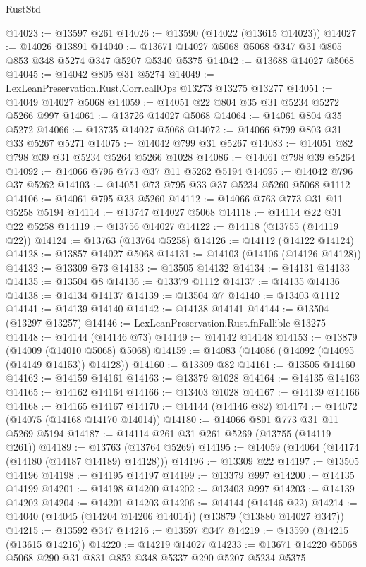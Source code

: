\begin{lexlean}{RustStd}
\begin{coremodule}
@14023 := @13597 @261
@14026 := @13590 (@14022 (@13615 @14023))
@14027 := @14026 @13891
@14040 := @13671 @14027 @5068 @5068 @347 @31 @805 @853 @348 @5274 @347 @5207 @5340 @5375
@14042 := @13688 @14027 @5068
@14045 := @14042 @805 @31 @5274
@14049 := LexLeanPreservation.Rust.Corr.callOps @13273 @13275 @13277
@14051 := @14049 @14027 @5068
@14059 := @14051 @22 @804 @35 @31 @5234 @5272 @5266 @997
@14061 := @13726 @14027 @5068
@14064 := @14061 @804 @35 @5272
@14066 := @13735 @14027 @5068
@14072 := @14066 @799 @803 @31 @33 @5267 @5271
@14075 := @14042 @799 @31 @5267
@14083 := @14051 @82 @798 @39 @31 @5234 @5264 @5266 @1028
@14086 := @14061 @798 @39 @5264
@14092 := @14066 @796 @773 @37 @11 @5262 @5194
@14095 := @14042 @796 @37 @5262
@14103 := @14051 @73 @795 @33 @37 @5234 @5260 @5068 @1112
@14106 := @14061 @795 @33 @5260
@14112 := @14066 @763 @773 @31 @11 @5258 @5194
@14114 := @13747 @14027 @5068
@14118 := @14114 @22 @31 @22 @5258
@14119 := @13756 @14027
@14122 := @14118 (@13755 (@14119 @22))
@14124 := @13763 (@13764 @5258)
@14126 := @14112 (@14122 @14124)
@14128 := @13857 @14027 @5068
@14131 := @14103 (@14106 (@14126 @14128))
@14132 := @13309 @73
@14133 := @13505 @14132
@14134 := @14131 @14133
@14135 := @13504 @8
@14136 := @13379 @1112
@14137 := @14135 @14136
@14138 := @14134 @14137
@14139 := @13504 @7
@14140 := @13403 @1112
@14141 := @14139 @14140
@14142 := @14138 @14141
@14144 := @13504 (@13297 @13257)
@14146 := LexLeanPreservation.Rust.fnFallible @13275
@14148 := @14144 (@14146 @73)
@14149 := @14142 @14148
@14153 := @13879 (@14009 (@14010 @5068) @5068)
@14159 := @14083 (@14086 (@14092 (@14095 (@14149 @14153)) @14128))
@14160 := @13309 @82
@14161 := @13505 @14160
@14162 := @14159 @14161
@14163 := @13379 @1028
@14164 := @14135 @14163
@14165 := @14162 @14164
@14166 := @13403 @1028
@14167 := @14139 @14166
@14168 := @14165 @14167
@14170 := @14144 (@14146 @82)
@14174 := @14072 (@14075 (@14168 @14170 @14014))
@14180 := @14066 @801 @773 @31 @11 @5269 @5194
@14187 := @14114 @261 @31 @261 @5269 (@13755 (@14119 @261))
@14189 := @13763 (@13764 @5269)
@14195 := @14059 (@14064 (@14174 (@14180 (@14187 @14189) @14128)))
@14196 := @13309 @22
@14197 := @13505 @14196
@14198 := @14195 @14197
@14199 := @13379 @997
@14200 := @14135 @14199
@14201 := @14198 @14200
@14202 := @13403 @997
@14203 := @14139 @14202
@14204 := @14201 @14203
@14206 := @14144 (@14146 @22)
@14214 := @14040 (@14045 (@14204 @14206 @14014)) (@13879 (@13880 @14027 @347))
@14215 := @13592 @347
@14216 := @13597 @347
@14219 := @13590 (@14215 (@13615 @14216))
@14220 := @14219 @14027
@14233 := @13671 @14220 @5068 @5068 @290 @31 @831 @852 @348 @5337 @290 @5207 @5234 @5375

\end{coremodule}
\end{lexlean}
